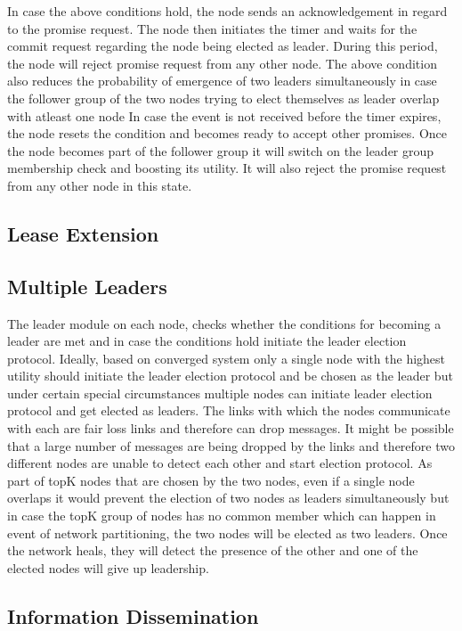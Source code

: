 \documentclass[a4paper,11pt]{kth-mag}
\begin{document}
In case the above conditions hold, the node sends an acknowledgement in regard to the promise request. The node then initiates the timer and waits for the commit request regarding the node being elected as leader. During this period, the node will reject promise request from any other node. The above condition also reduces the probability of emergence of two leaders simultaneously in case the follower group of the two nodes trying to elect themselves as leader overlap with atleast one node In case the event is not received before the timer expires, the node resets the condition and becomes ready to accept other promises. Once the node becomes part of the follower group it will switch on the leader group membership check and boosting its utility. It will also reject the promise request from any other node in this state.

\subsection{Lease Extension}



\subsection{Multiple Leaders}

The leader module on each node, checks whether the conditions for becoming a leader are met and in case the conditions hold initiate the leader election protocol. Ideally, based on converged system only a single node with the highest utility should initiate the leader election protocol and be chosen as the leader but under certain special circumstances multiple nodes can initiate leader election protocol and get elected as leaders. The links with which the nodes communicate with each are fair loss links and therefore can drop messages. It might be possible that a large number of messages are being dropped by the links and therefore two different nodes are unable to detect each other and start election protocol. As part of topK nodes that are chosen by the two nodes, even if a single node overlaps it would prevent the election of two nodes as leaders simultaneously but in case the topK group of nodes has no common member which can happen in event of network partitioning, the two nodes will be elected as two leaders. Once the network heals, they will detect the presence of the other and one of the elected nodes will give up leadership.


\subsection{Information Dissemination}
\end{document}

